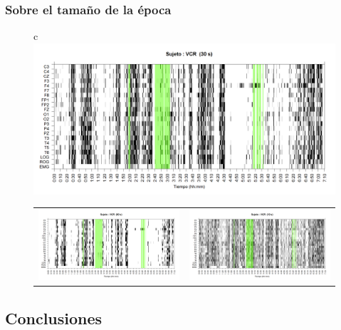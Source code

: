 \documentclass{beamer}
\begin{document}

\begin{frame}\frametitle{Sobre el tama\~no de la \'epoca}
\begin{figure}
\centering
\begin{tabular}{c}
\includegraphics[width=0.5\linewidth]
{./p_170511/VCNNS1_est_30.png} \\
\begin{tabular}{cc}
\includegraphics[width=0.45\linewidth]
{./p_170511/VCNNS1_est_60.png} 
&
\includegraphics[width=0.45\linewidth]
{./p_170511/VCNNS1_est_10.png} 
\end{tabular}
\end{tabular}
\end{figure}
\end{frame}


\subsection{Conclusiones}
\end{document}
